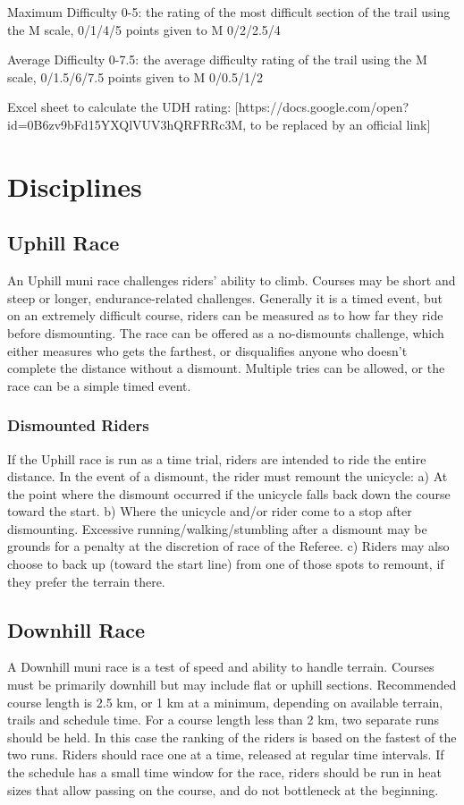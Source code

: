 Maximum Difficulty 0-5: the rating of the most difficult section of the trail using the M scale, 0/1/4/5 points given to M 0/2/2.5/4

Average Difficulty 0-7.5: the average difficulty rating of the trail using the M scale, 0/1.5/6/7.5 points given to M 0/0.5/1/2

Excel sheet to calculate the UDH rating: [https://docs.google.com/open?id=0B6zv9bFd15YXQlVUV3hQRFRRc3M, to be replaced by an official link]


\section{Disciplines}

\subsection{Uphill Race}
An Uphill muni race challenges riders' ability to climb. Courses may be short
and steep or longer, endurance-related challenges. Generally it is a timed
event, but on an extremely difficult course, riders can be measured as to how
far they ride before dismounting. The race can be offered as a no-dismounts
challenge, which either measures who gets the farthest, or disqualifies anyone
who doesn't complete the distance without a dismount. Multiple tries can be
allowed, or the race can be a simple timed event.

\subsubsection{Dismounted Riders}
If the Uphill race is run as a time trial, riders are intended to ride the
entire distance. In the event of a dismount, the rider must remount the
unicycle: 
a) At the point where the dismount occurred if the unicycle falls back
down the course toward the start. 
b) Where the unicycle and/or rider come to a
stop after dismounting. Excessive running/walking/stumbling after a dismount may
be grounds for a penalty at the discretion of race of the Referee. 
c) Riders may
also choose to back up (toward the start line) from one of those spots to
remount, if they prefer the terrain there.
 

\subsection{Downhill Race}
A Downhill muni race is a test of speed and ability to handle terrain. Courses
must be primarily downhill but may include flat or uphill sections. Recommended
course length is 2.5 km, or 1 km at a minimum, depending on available terrain,
trails and schedule time. For a course length less than 2 km, two separate runs
should be held. In this case the ranking of the riders is based on the fastest
of the two runs. Riders should race one at a time, released at regular time
intervals. If the schedule has a small time window for the race, riders should
be run in heat sizes that allow passing on the course, and do not bottleneck at
the beginning.

